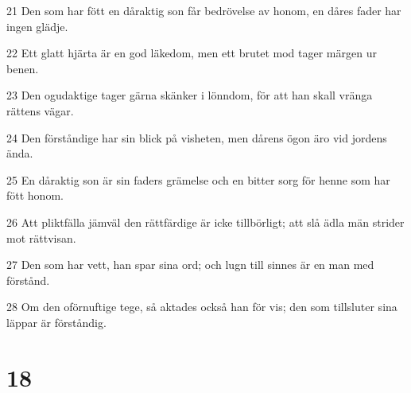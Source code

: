 \par 21 Den som har fött en dåraktig son får bedrövelse av honom, en dåres fader har ingen glädje.
\par 22 Ett glatt hjärta är en god läkedom, men ett brutet mod tager märgen ur benen.
\par 23 Den ogudaktige tager gärna skänker i lönndom, för att han skall vränga rättens vägar.
\par 24 Den förståndige har sin blick på visheten, men dårens ögon äro vid jordens ända.
\par 25 En dåraktig son är sin faders grämelse och en bitter sorg för henne som har fött honom.
\par 26 Att pliktfälla jämväl den rättfärdige är icke tillbörligt; att slå ädla män strider mot rättvisan.
\par 27 Den som har vett, han spar sina ord; och lugn till sinnes är en man med förstånd.
\par 28 Om den oförnuftige tege, så aktades också han för vis; den som tillsluter sina läppar är förståndig.

\chapter{18}

